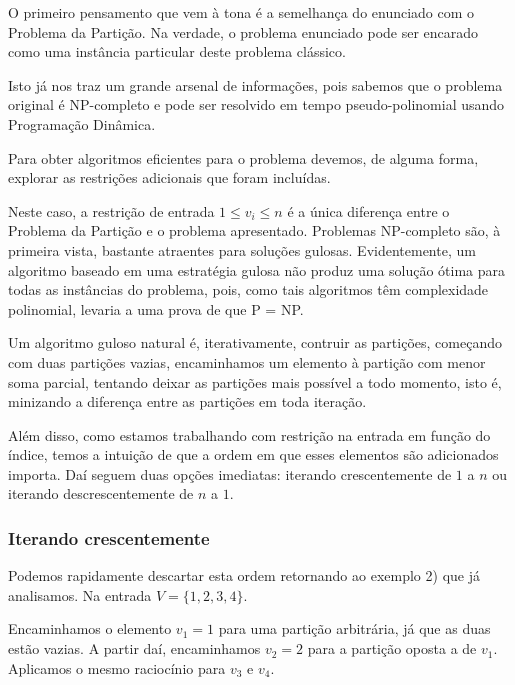 O primeiro pensamento que vem à tona é a semelhança do enunciado com o Problema da Partição. Na verdade, o problema enunciado pode ser encarado como uma instância particular deste problema clássico.

Isto já nos traz um grande arsenal de informações, pois sabemos que o problema original é NP-completo \cite{karp1972reducibility} e pode ser resolvido em tempo pseudo-polinomial usando Programação Dinâmica.

Para obter algoritmos eficientes para o problema devemos, de alguma forma, explorar as restrições adicionais que foram incluídas.

Neste caso, a restrição de entrada $1 \leq v_i \leq n$ é a única diferença entre o Problema da Partição e o problema apresentado. 
Problemas NP-completo são, à primeira vista, bastante atraentes para soluções gulosas. Evidentemente, um algoritmo baseado em uma estratégia gulosa não produz uma solução ótima para todas as instâncias do problema, pois, como tais algoritmos têm complexidade polinomial, levaria a uma prova de que P = NP.

\label{particao:abordagem}

Um algoritmo guloso natural é, iterativamente, contruir as partições, começando com duas partições vazias, encaminhamos um elemento à partição com menor soma parcial, tentando deixar as partições mais  possível a todo momento, isto é, minizando a diferença entre as partições em toda iteração.

Além disso, como estamos trabalhando com restrição na entrada em função do índice, temos a intuição de que a ordem em que esses elementos são adicionados importa. Daí seguem duas opções imediatas: iterando crescentemente de $1$ a $n$ ou iterando descrescentemente de $n$ a $1$.

\subsubsection*{Iterando crescentemente}

Podemos rapidamente descartar esta ordem retornando ao exemplo 2) que já analisamos. Na entrada $V = \{1, 2, 3, 4\}$.

Encaminhamos o elemento $v_1 = 1$ para uma partição arbitrária, já que as duas estão vazias. A partir daí, encaminhamos $v_2 = 2$ para a partição oposta a de $v_1$. Aplicamos o mesmo raciocínio para $v_3$ e $v_4$.


